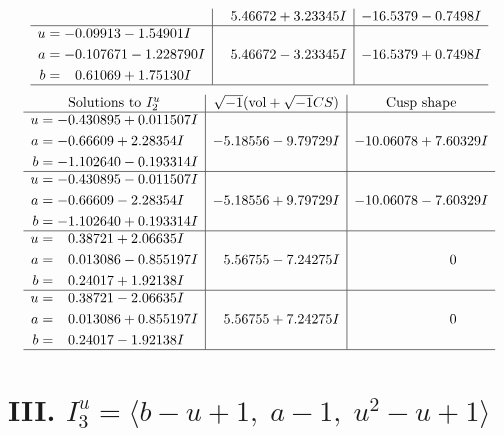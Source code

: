 \documentclass[1p]{elsarticle_modified}
\theoremstyle{definition}
\newcommand{\I}{\sqrt{-1}}
\begin{document}
$$\begin{array}{c|c|c}
 & \phantom{-}5.46672 + 3.23345 I & -16.5379 - 0.7498 I \\ \hline\begin{aligned}
u &= -0.09913 - 1.54901 I \\
a &= -0.107671 - 1.228790 I \\
b &= \phantom{-}0.61069 + 1.75130 I\end{aligned}
 & \phantom{-}5.46672 - 3.23345 I & -16.5379 + 0.7498 I\\
 \hline 
 \end{array}$$\newpage$$\begin{array}{c|c|c}  
\text{Solutions to }I^u_{2}& \I (\text{vol} + \sqrt{-1}CS) & \text{Cusp shape}\\
 \hline 
\begin{aligned}
u &= -0.430895 + 0.011507 I \\
a &= -0.66609 + 2.28354 I \\
b &= -1.102640 - 0.193314 I\end{aligned}
 & -5.18556 - 9.79729 I & -10.06078 + 7.60329 I \\ \hline\begin{aligned}
u &= -0.430895 - 0.011507 I \\
a &= -0.66609 - 2.28354 I \\
b &= -1.102640 + 0.193314 I\end{aligned}
 & -5.18556 + 9.79729 I & -10.06078 - 7.60329 I \\ \hline\begin{aligned}
u &= \phantom{-}0.38721 + 2.06635 I \\
a &= \phantom{-}0.013086 - 0.855197 I \\
b &= \phantom{-}0.24017 + 1.92138 I\end{aligned}
 & \phantom{-}5.56755 - 7.24275 I & \phantom{-0.000000 } 0 \\ \hline\begin{aligned}
u &= \phantom{-}0.38721 - 2.06635 I \\
a &= \phantom{-}0.013086 + 0.855197 I \\
b &= \phantom{-}0.24017 - 1.92138 I\end{aligned}
 & \phantom{-}5.56755 + 7.24275 I & \phantom{-0.000000 } 0\\
 \hline 
 \end{array}$$\newpage\newpage\renewcommand{\arraystretch}{1}
\centering \section*{III. $I^u_{3}= \langle b- u+1,\;a-1,\;u^2- u+1 \rangle$}
\end{document}

